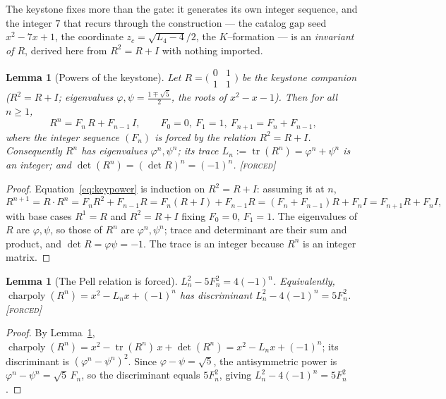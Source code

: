 \documentclass[11pt]{article}
\theoremstyle{plain}
\newtheorem{lemma}[theorem]{Lemma}
\theoremstyle{definition}
\theoremstyle{remark}
\newcommand{\forced}{\textcolor{forcedc}{\textsc{[forced]}}}
\begin{document}
The keystone fixes more than the gate: it generates its own integer sequence, and the integer $7$ that recurs through the construction --- the catalog $\mathrm{gap}$ seed $x^2-7x+1$, the coordinate $z_c=\sqrt{L_4-4}/2$, the $K$--formation --- is an \emph{invariant of $R$}, derived here from $R^2=R+I$ with nothing imported.

\begin{lemma}[Powers of the keystone]\label{lem:keypowers}
Let $R=\bigl(\begin{smallmatrix}0&1\\1&1\end{smallmatrix}\bigr)$ be the keystone companion ($R^2=R+I$; eigenvalues $\varphi,\psi=\tfrac{1\mp\sqrt5}{2}$, the roots of $x^2-x-1$). Then for all $n\ge1$,
\begin{equation}\label{eq:keypower}
R^n=F_n\,R+F_{n-1}\,I,\qquad F_0=0,\ F_1=1,\ F_{n+1}=F_n+F_{n-1},
\end{equation}
where the integer sequence $(F_n)$ is \emph{forced} by the relation $R^2=R+I$. Consequently $R^n$ has eigenvalues $\varphi^n,\psi^n$; its trace $L_n:=\operatorname{tr}(R^n)=\varphi^n+\psi^n$ is an integer; and $\det(R^n)=(\det R)^n=(-1)^n$. \forced
\end{lemma}

\begin{proof}
Equation~\eqref{eq:keypower} is induction on $R^2=R+I$: assuming it at $n$,
\[
R^{n+1}=R\cdot R^n=F_nR^2+F_{n-1}R=F_n(R+I)+F_{n-1}R=(F_n+F_{n-1})R+F_nI=F_{n+1}R+F_nI,
\]
with base cases $R^1=R$ and $R^2=R+I$ fixing $F_0=0,\,F_1=1$. The eigenvalues of $R$ are $\varphi,\psi$, so those of $R^n$ are $\varphi^n,\psi^n$; trace and determinant are their sum and product, and $\det R=\varphi\psi=-1$. The trace is an integer because $R^n$ is an integer matrix. \end{proof}

\begin{lemma}[The Pell relation is forced]\label{lem:pell}
$L_n^2-5F_n^2=4(-1)^n$. Equivalently, $\operatorname{charpoly}(R^n)=x^2-L_nx+(-1)^n$ has discriminant $L_n^2-4(-1)^n=5F_n^2$. \forced
\end{lemma}

\begin{proof}
By Lemma~\ref{lem:keypowers}, $\operatorname{charpoly}(R^n)=x^2-\operatorname{tr}(R^n)\,x+\det(R^n)=x^2-L_nx+(-1)^n$; its discriminant is $(\varphi^n-\psi^n)^2$. Since $\varphi-\psi=\sqrt5$, the antisymmetric power is $\varphi^n-\psi^n=\sqrt5\,F_n$, so the discriminant equals $5F_n^2$, giving $L_n^2-4(-1)^n=5F_n^2$. \end{proof}
\end{document}
